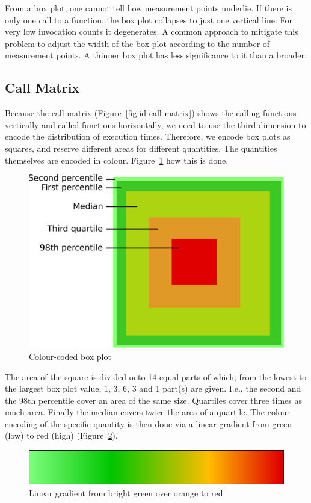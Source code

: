 \documentclass[b5paper, final, hauptseminar]{zih-template}
\begin{document}
From a box plot, one cannot tell how measurement points underlie.
If there is only one call to a function, the box plot collapses to just one vertical line. For very low invocation counts it degenerates.
A common approach to mitigate this problem to adjust the width of the box plot according to the number of measurement points.
A thinner box plot has less significance to it than a broader.

\clearpage %
\subsection{Call Matrix}
Because the call matrix (Figure~\ref{fig:id-call-matrix}) shows the calling functions vertically and called functions horizontally, we need to use the third dimension to encode the distribution of execution times.
Therefore, we encode box plots as squares, and reserve different areas for different quantities.
The quantities themselves are encoded in colour.
Figure~\ref{fig:id-m-color-coded-boxplot} how this is done.
\begin{figure}[htbp]
	\centering
	\includegraphics[width=0.7\linewidth]{id-m-color-coded-boxplot}
	\caption{Colour-coded box plot}
	\label{fig:id-m-color-coded-boxplot}
\end{figure}
The area of the square is divided onto 14 equal parts of which, from the lowest to the largest box plot value, 1, 3, 6, 3 and 1 part(s) are given. I.e., the second and the 98th percentile cover an area of the same size. Quartiles cover three times as much area. Finally the median covers twice the area of a quartile.
The colour encoding of the specific quantity is then done via a linear gradient from green (low) to red (high) (Figure~\ref{fig:id-m-gradient}).
\begin{figure}[htbp]
	\centering
	\includegraphics[width=0.5\linewidth]{id-m-gradient}
	\caption{Linear gradient from bright green over orange to red}
	\label{fig:id-m-gradient}
\end{figure}
\end{document}
